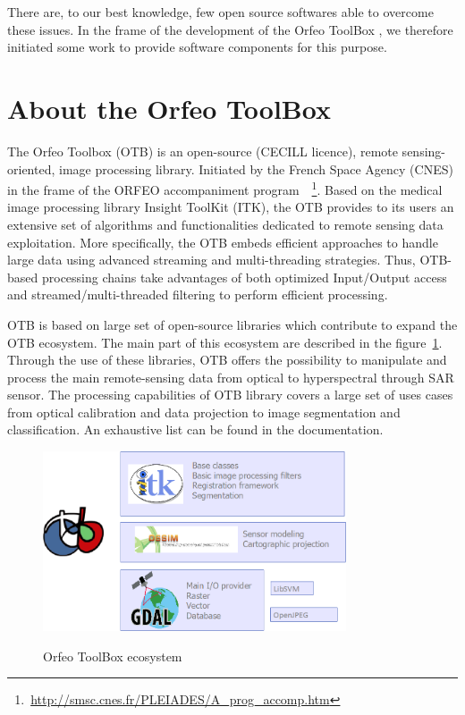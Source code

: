 \documentclass{josis}
\newcommand{\furl}[1]{    $\,$\footnote{$\,$\url{#1}}}
\begin{document}
There are, to our best knowledge, few open source softwares able to
overcome these issues. In the frame of the development of the Orfeo
ToolBox \cite{}, we therefore initiated some work to provide software
components for this purpose.

\section{About the Orfeo ToolBox}

The Orfeo Toolbox (OTB) is an open-source (CECILL licence), remote sensing-oriented, image processing library. Initiated by the French Space Agency (CNES) in the frame of the ORFEO accompaniment program~\furl{http://smsc.cnes.fr/PLEIADES/A_prog_accomp.htm}. Based on the medical image processing library Insight ToolKit (ITK), the OTB provides to its users an extensive set of algorithms and functionalities dedicated to remote sensing data exploitation. More specifically, the OTB embeds efficient approaches to handle large data using advanced streaming and multi-threading strategies. Thus, OTB-based processing chains take advantages of both optimized Input/Output access and streamed/multi-threaded filtering to perform efficient processing.

OTB is based on large set of open-source libraries which contribute to expand the OTB ecosystem. The main part of this ecosystem are described in the figure~\ref{fig:ecosystem}. Through the use of these libraries, OTB offers the possibility to manipulate and process the main remote-sensing data from optical to hyperspectral through SAR sensor. The processing capabilities of OTB library covers a large set of uses cases from optical calibration and data projection to image segmentation and classification. An exhaustive list can be found in the documentation.   

\begin{figure}[!htb]
\centering
\includegraphics[width=0.8\textwidth]{Pictures/otb_ecosystem}\label{fig:ecosystem}
\caption{Orfeo ToolBox ecosystem}
\end{figure}
\end{document}
